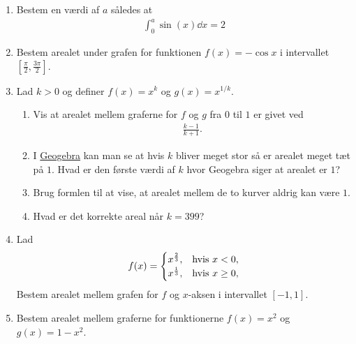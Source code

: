 \begin{enumerate}
	\item Bestem en værdi af $a$ således at 
	\begin{align*}
	\int_0^a\sin(x)\dd x=2
	\end{align*}
	
	\item Bestem arealet under grafen for funktionen $f(x)=-\cos x$ i intervallet $ [\frac{\pi}{2},\frac{3\pi}{2}] $. 
	

	
	\item Lad $k>0$ og definer $f(x)=x^k$ og $g(x)=x^{1/k}$.
	\begin{enumerate}
		\item Vis at arealet mellem graferne for $f$ og $g$ fra $0$ til $1$ er givet ved 
		\begin{align*}
		\frac{k-1}{k+1}.
		\end{align*}
		\item I \href{https://www.geogebra.org/m/csvbae28}{Geogebra} kan man se at hvis $k$ bliver meget stor så er arealet meget tæt på $1$. Hvad er den første værdi af $k$ hvor Geogebra siger at arealet er $1$?
		\item Brug formlen til at vise, at arealet mellem de to kurver aldrig kan være $1$.
		\item Hvad er det korrekte areal når $k=399$?
		\end{enumerate}
	
	\item Lad 
	\begin{align*}
	f(x)=\begin{cases}
	x^{\frac{2}{3}},& \textup{hvis } x<0,\\
	x^{\frac{1}{3}},& \textup{hvis } x\geq 0,
	\end{cases}
	\end{align*}
	Bestem arealet mellem grafen for $f$ og $x$-aksen i intervallet $ [-1,1] $.
	
	


	\item Bestem arealet mellem graferne for funktionerne $f(x)=x^2$ og $g(x)=1-x^2$.
	

\end{enumerate}

